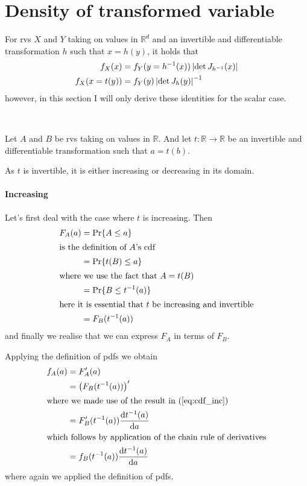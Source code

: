 \section{Density of transformed variable}

For rvs $X$ and $Y$ taking on values in $\mathbb R^d$ and an invertible and differentiable transformation $h$ such that $x = h(y)$, it holds that
\begin{align}\label{eq:change-of-density-d}
    f_X(x) &= f_Y(y={h}^{-1}(x))\left| \det J_{{h}^{-1}}(x) \right|  \\
    f_X(x=t(y)) &= f_Y(y)\left| \det J_{h}(y) \right|^{-1}
\end{align}
however, in this section I will only derive these identities for the scalar case.

~

Let $A$ and $B$ be rvs taking on values in $\mathbb R$. And let $t: \mathbb R \to \mathbb R$ be an invertible and differentiable transformation such that $a = t(b)$.


As $t$ is invertible, it is either increasing or decreasing in its domain. 

\paragraph{Increasing} Let's first deal with the case where $t$ is increasing. Then
\begin{subequations}
\begin{align}
    F_A(a) &= \operatorname*{Pr}\{{A \le a}\} \\
    \intertext{is the definition of $A$'s cdf}
    &= \operatorname*{Pr}\{{t(B) \le a}\} \\
    \intertext{where we use the fact that $A = t(B)$}
    &= \operatorname*{Pr}\{{B \le {t}^{-1}(a)}\} \\
    \intertext{here it is essential that $t$ be increasing and invertible}
    &= F_B({t}^{-1}(a)) \label{eq:cdf_inc}
\end{align}
\end{subequations}
and finally we realise that we can express $F_A$ in terms of $F_B$.

Applying the definition of pdfs we obtain
\begin{subequations}
\begin{align}
    f_A(a) &= F'_A(a)  \\
    &= \left(F_B({t}^{-1}(a))\right)' \\
    \intertext{where we made use of the result in (\ref{eq:cdf_inc})}
    &= F'_B({t}^{-1}(a))\dv{{t}^{-1}(a)}{a} \\
    \intertext{which follows by application of the chain rule of derivatives} 
    &= f_B({t}^{-1}(a))\dv{{t}^{-1}(a)}{a} \label{eq:change_inc}
\end{align}
\end{subequations}
where again we applied the definition of pdfs.

